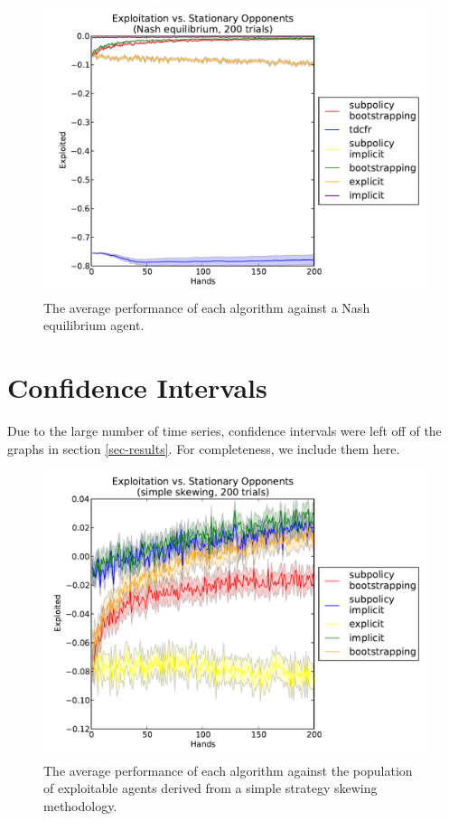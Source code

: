 \documentclass{aamas2013}
\begin{document}
\begin{figure}[tbh]
\centering
  \includegraphics[scale=.4]{exploited_nash_tdcfr.pdf}
\caption{The average performance of each algorithm against a Nash equilibrium agent.}
\label{fig-exploitednash-tdcfr}
\end{figure}

\section{Confidence Intervals}

Due to the large number of time series, confidence intervals were left off of the graphs in section \ref{sec-results}. For completeness, we include them here.

\begin{figure}[tbh]
\centering
  \includegraphics[scale=.4]{exploited_simple_confidence.pdf}
\caption{The average performance of each algorithm against the population of exploitable agents derived from a simple strategy skewing methodology.}
\label{fig-exploitedsimple-confidence}
\end{figure}
\end{document}
